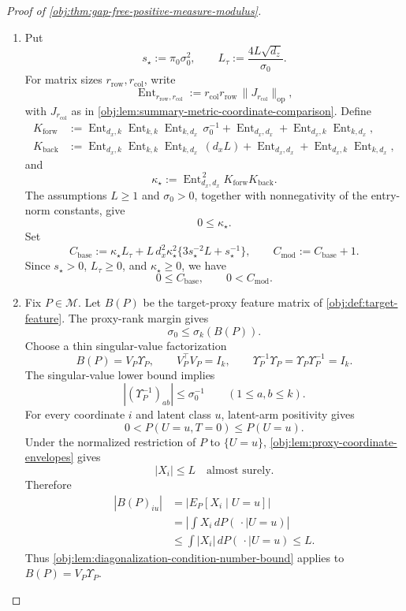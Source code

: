 \begin{proof}[Proof of \cref{obj:thm:gap-free-positive-measure-modulus}]
\begin{enumerate}
\item Put
\[
s_\star:=\pi_0\sigma_0^2,
\qquad
L_\tau:=\frac{4L\sqrt{d_z}}{\sigma_0}.
\]
For matrix sizes \(r_{\mathrm{row}},r_{\mathrm{col}}\), write
\[
\operatorname{Ent}_{r_{\mathrm{row}},r_{\mathrm{col}}}
:=
r_{\mathrm{col}}r_{\mathrm{row}}\,
\|J_{r_{\mathrm{col}}}\|_{\mathrm{op}},
\]
with \(J_{r_{\mathrm{col}}}\) as in \cref{obj:lem:summary-metric-coordinate-comparison}.  Define
\[
\begin{aligned}
K_{\mathrm{forw}}
&:=
\operatorname{Ent}_{d_x,k}\operatorname{Ent}_{k,k}
\operatorname{Ent}_{k,d_x}\,\sigma_0^{-1}
+\operatorname{Ent}_{d_x,d_x}
+\operatorname{Ent}_{d_x,k}\operatorname{Ent}_{k,d_x},\\
K_{\mathrm{back}}
&:=
\operatorname{Ent}_{d_x,k}\operatorname{Ent}_{k,k}
\operatorname{Ent}_{k,d_x}\,(d_xL)
+\operatorname{Ent}_{d_x,d_x}
+\operatorname{Ent}_{d_x,k}\operatorname{Ent}_{k,d_x},
\end{aligned}
\]
and
\[
\kappa_\star
:=
\operatorname{Ent}_{d_x,d_x}^{\,2}K_{\mathrm{forw}}K_{\mathrm{back}} .
\]
The assumptions \(L\ge1\) and \(\sigma_0>0\), together with nonnegativity of the entry-norm constants, give
\[
0\le \kappa_\star .
\]
Set
\[
C_{\mathrm{base}}
:=
\kappa_\star L_\tau
+
L\,d_x^2\kappa_\star^2
\{3s_\star^{-2}L+s_\star^{-1}\},
\qquad
C_{\mathrm{mod}}:=C_{\mathrm{base}}+1 .
\]
Since \(s_\star>0\), \(L_\tau\ge0\), and \(\kappa_\star\ge0\), we have
\[
0\le C_{\mathrm{base}},
\qquad
0<C_{\mathrm{mod}} .
\]

\item Fix \(P\in\mathcal M\).  Let \(B(P)\) be the target-proxy feature matrix of \cref{obj:def:target-feature}.  The proxy-rank margin gives
\[
\sigma_0\le \sigma_k(B(P)).
\]
Choose a thin singular-value factorization
\[
B(P)=V_P\Upsilon_P,
\qquad
V_P^\top V_P=I_k,
\qquad
\Upsilon_P^{-1}\Upsilon_P=\Upsilon_P\Upsilon_P^{-1}=I_k .
\]
The singular-value lower bound implies
\[
|(\Upsilon_P^{-1})_{ab}|\le \sigma_0^{-1}
\qquad(1\le a,b\le k).
\]
For every coordinate \(i\) and latent class \(u\), latent-arm positivity gives
\[
0<P(U=u,T=0)\le P(U=u).
\]
Under the normalized restriction of \(P\) to \(\{U=u\}\), \cref{obj:lem:proxy-coordinate-envelopes} gives
\[
|X_i|\le L\quad\text{almost surely}.
\]
Therefore
\[
\begin{aligned}
|B(P)_{iu}|
&=\left|E_P[X_i\mid U=u]\right|\\
&=\left|\int X_i\,dP(\,\cdot\mid U=u)\right|\\
&\le \int |X_i|\,dP(\,\cdot\mid U=u)
\le L .
\end{aligned}
\]
Thus \cref{obj:lem:diagonalization-condition-number-bound} applies to \(B(P)=V_P\Upsilon_P\).


\end{enumerate}
\end{proof}

